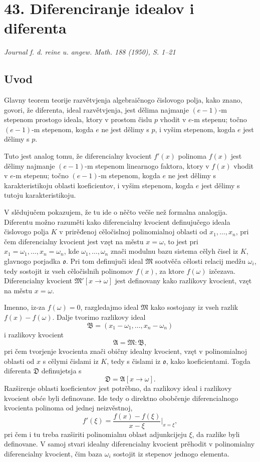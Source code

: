 \documentclass[11pt]{article}
\newcommand{\foreign}[1]{#1}
\begin{document}
\section*{43. Diferenciranje idealov i diferenta}

\begin{center}
\emph{\foreign{Journal f. d. reine u. angew. Math. 188 (1950), S. 1--21}}
\end{center}

\subsection*{Uvod}

Glavny teorem teorije razvětvjenja algebraičnogo čislovogo polja, kako znano, govori, že diferenta, ideal razvětvjenja, jest dělima najmanje \((e-1)\)-m stepenom prostogo ideala, ktory v prostom čislu \(p\) vhodit v \(e\)-m stepenu; točno \((e-1)\)-m stepenom, kogda \(e\) ne jest dělimy s \(p\), i vyšim stepenom, kogda \(e\) jest dělimy s \(p\).

Tuto jest analog tomu, že diferencialny kvocient \(f'(x)\) polinoma \(f(x)\) jest dělimy najmanje \((e-1)\)-m stepenom linearnogo faktora, ktory v \(f(x)\) vhodit v \(e\)-m stepenu; točno \((e-1)\)-m stepenom, kogda \(e\) ne jest dělimy s karakteristikoju oblasti koeficientov, i vyšim stepenom, kogda \(e\) jest dělimy s tutoju karakteristikoju.

V slědujučem pokazujem, že tu ide o něčto večše než formalna analogija. Diferentu možno razuměti kako diferencialny kvocient definujučego ideala čislovogo polja \(K\) v prirěđenoj cěločislnoj polinomialnoj oblasti od \(x_1,\ldots,x_n\), pri čem diferencialny kvocient jest vzęt na městu \(x=\omega\), to jest pri \(x_1=\omega_1,\ldots,x_n=\omega_n\), kde \(\omega_1,\ldots,\omega_n\) znači modulnu bazu sistema cělyh čisel iz \(K\), glavnogo porjadka \(\mathfrak o\). Pri tom definujuči ideal \(\mathfrak M\) sootvěča cělosti relacij medžu \(\omega_i\), tedy sostojit iz vseh cěločislnih polinomov \(f(x)\), za ktore \(f(\omega)\) izčezava. Diferencialny kvocient \(\mathfrak M'[x\to\omega]\) jest definovany kako razlikovy kvocient, vzęt na městu \(x=\omega\).

Imenno, iz-za \(f(\omega)=0\), razgledajmo ideal \(\mathfrak M\) kako sostojany iz vseh razlik \(f(x)-f(\omega)\). Dalje tvorimo razlikovy ideal
\[
        \mathfrak B=(x_1-\omega_1,\ldots,x_n-\omega_n)
\]
i razlikovy kvocient
\[
        \mathfrak A=\mathfrak M:\mathfrak B,
\]
pri čem tvorjenje kvocienta znači običny idealny kvocient, vzęt v polinomialnoj oblasti od \(x\) s cělymi čislami iz \(K\), tedy s čislami iz \(\mathfrak o\), kako koeficientami. Togda diferenta \(\mathfrak D\) definujetsja s
\[
        \mathfrak D=\mathfrak A[x\to\omega].
\]
Razširenje oblasti koeficientov jest potrěbno, da razlikovy ideal i razlikovy kvocient obće byli definovane. Ide tedy o direktno obobčenje diferencialnogo kvocienta polinoma od jednej neizvěstnoj,
\[
        f'(\xi)=\frac{f(x)-f(\xi)}{x-\xi}\bigg|_{x=\xi},
\]
pri čem i tu treba razširiti polinomialnu oblast adjunkcijeju \(\xi\), da razlike byli definovane. V samoj stvari idealny diferencialny kvocient prěhodit v polinomialny diferencialny kvocient, čim baza \(\omega_i\) sostojit iz stepenov jednogo elementa.
\end{document}
